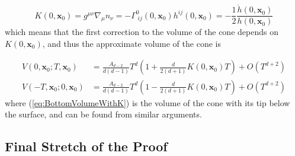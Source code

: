 \documentclass[12pt]{article}
\newcommand{\be}{\begin{equation}}
\newcommand{\ee}{\end{equation}}
\begin{document}
\be\label{eq:K}
K(0,\mathbf{x}_0)
=g^{\mu\nu }\nabla_{\mu}n_{\nu}
=-\Gamma^{0}_{\;ij}(0,\mathbf{x}_0)h^{ij}(0,\mathbf{x}_0)=-\frac{1}{2}\frac{\dot{h}(0,\mathbf{x}_0)}{h(0,\mathbf{x}_0)}
\ee
which means that the first correction to the volume of the cone depends on $K(0,\mathbf{x}_0)$, and thus the approximate volume of the cone is

\begin{align}
V(0,\mathbf{x}_0;T,\mathbf{x}_0)
&=\frac{A_{d-2}}{d(d-1)}T^d\left(1+\frac{d}{2(d+1)}K(0,\mathbf{x}_0)T\right)
+O(T^{d+2}) \label{eq:TopVolumeWithK}\\
V(-T,\mathbf{x}_0;0,\mathbf{x}_0)
&=\frac{A_{d-2}}{d(d-1)}T^d\left(1-\frac{d}{2(d+1)}K(0,\mathbf{x}_0)T\right)
+O(T^{d+2}) \label{eq:BottomVolumeWithK}
\end{align}
where (\ref{eq:BottomVolumeWithK}) is the volume of the cone with its tip below the surface, and can be found from similar arguments.

\subsection{Final Stretch of the Proof}
\end{document}
